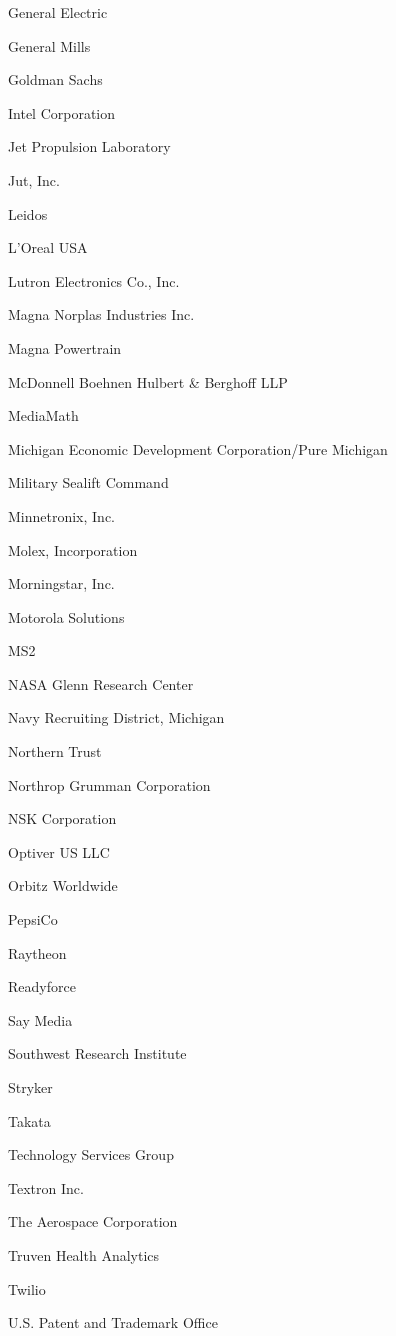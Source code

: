 \documentclass[twoside]{article}
\begin{document}
\begin{center}
\begin{multicols}{5}
\begin{FlushLeft}
\begin{compactitem}
\item General Electric
\item General Mills
\item Goldman Sachs
\item Intel Corporation
\item Jet Propulsion Laboratory
\item Jut, Inc.
\item Leidos
\item L'Oreal USA
\item Lutron Electronics Co., Inc.
\item Magna Norplas Industries Inc.
\item Magna Powertrain
\item McDonnell Boehnen Hulbert \& Berghoff LLP
\item MediaMath
\item Michigan Economic Development Corporation/Pure Michigan
\item Military Sealift Command
\item Minnetronix, Inc.
\item Molex, Incorporation
\item Morningstar, Inc.
\item Motorola Solutions
\item MS2
\item NASA Glenn Research Center
\item Navy Recruiting District, Michigan
\item Northern Trust
\item Northrop Grumman Corporation
\item NSK Corporation
\item Optiver US LLC
\item Orbitz Worldwide
\item PepsiCo
\item Raytheon
\item Readyforce
\item Say Media
\item Southwest Research Institute
\item Stryker
\item Takata
\item Technology Services Group
\item Textron Inc.
\item The Aerospace Corporation
\item Truven Health Analytics
\item Twilio
\item U.S. Patent and Trademark Office

\end{compactitem}
\end{FlushLeft}
\end{multicols}
\end{center}
\end{document}

